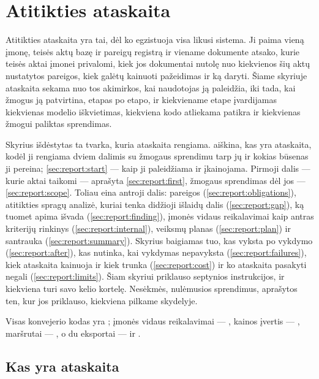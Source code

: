 \chapter{Atitikties ataskaita}\label{ch:report}

Atitikties ataskaita yra tai, dėl ko egzistuoja visa likusi sistema. Ji paima vieną įmonę,
teisės aktų bazę ir pareigų registrą ir viename dokumente atsako, kurie teisės aktai įmonei
privalomi, kiek jos dokumentai nutolę nuo kiekvienos šių aktų nustatytos pareigos, kiek galėtų
kainuoti pažeidimas ir ką daryti. Šiame skyriuje ataskaita sekama nuo tos akimirkos, kai
naudotojas ją paleidžia, iki tada, kai žmogus ją patvirtina, etapas po etapo, ir kiekviename
etape įvardijamas kiekvienas modelio iškvietimas, kiekviena kodo atliekama patikra ir kiekvienas
žmogui paliktas sprendimas.

Skyrius išdėstytas ta tvarka, kuria ataskaita rengiama.  aiškina, kas
yra ataskaita, kodėl ji rengiama dviem dalimis su žmogaus sprendimu tarp jų ir kokias būsenas ji
pereina; \cref{sec:report:start} --- kaip ji paleidžiama ir įkainojama. Pirmoji dalis --- kurie
aktai taikomi --- aprašyta \cref{sec:report:first}, žmogaus sprendimas dėl jos ---
\cref{sec:report:scope}. Toliau eina antroji dalis: pareigos (\cref{sec:report:obligations}),
atitikties spragų analizė, kuriai tenka didžioji išlaidų dalis (\cref{sec:report:gap}), ką
tuomet apima išvada (\cref{sec:report:finding}), įmonės vidaus reikalavimai kaip antras
kriterijų rinkinys (\cref{sec:report:internal}), veiksmų planas (\cref{sec:report:plan}) ir
santrauka (\cref{sec:report:summary}). Skyrius baigiamas tuo, kas vyksta po vykdymo
(\cref{sec:report:after}), kas nutinka, kai vykdymas nepavyksta (\cref{sec:report:failures}),
kiek ataskaita kainuoja ir kiek trunka (\cref{sec:report:cost}) ir ko ataskaita pasakyti negali
(\cref{sec:report:limits}). Šiam skyriui priklauso septynios instrukcijos, ir kiekviena turi
savo kelio kortelę. Nesėkmės, nulėmusios sprendimus, aprašytos ten, kur jos priklauso,
kiekviena pilkame skydelyje.

Visas konvejerio kodas yra ; įmonės vidaus reikalavimai ---
, kainos įvertis --- , maršrutai ---
, o du eksportai ---  ir
.


\section{Kas yra ataskaita}\label{sec:report:what}

